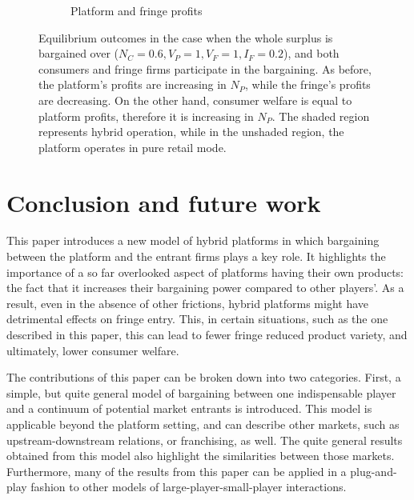 \documentclass[a4paper]{article}
\begin{document}
\begin{figure}
\begin{subfigure}[b]{0.45\textwidth}
        \caption{Platform and fringe profits}
        \label{fig:profits_full_surplus_two_sided}
    \end{subfigure}
    \caption{Equilibrium outcomes in the case when the whole surplus is bargained over ($N_C = 0.6, V_P = 1, V_F = 1, I_F = 0.2$), and both consumers and fringe firms participate in the bargaining. As before, the platform's profits are increasing in $N_P$, while the fringe's profits are decreasing. On the other hand, consumer welfare is equal to platform profits, therefore it is increasing in $N_P$. The shaded region represents hybrid operation, while in the unshaded region, the platform operates in pure retail mode.}
    \label{fig:equilibrium_full_surplus_two_sided}
\end{figure}

\section{Conclusion and future work}
\label{sec:conclusion}

This paper introduces a new model of hybrid platforms in which bargaining between the platform and the entrant firms plays a key role.
It highlights the importance of a so far overlooked aspect of platforms having their own products: the fact that it increases their bargaining power compared to other players'.
As a result, even in the absence of other frictions, hybrid platforms might have detrimental effects on fringe entry.
This, in certain situations, such as the one described in this paper, this can lead to fewer fringe reduced product variety, and ultimately, lower consumer welfare.

The contributions of this paper can be broken down into two categories.
First, a simple, but quite general model of bargaining between one indispensable player and a continuum of potential market entrants is introduced.
This model is applicable beyond the platform setting, and can describe other markets, such as upstream-downstream relations, or franchising, as well.
The quite general results obtained from this model also highlight the similarities between those markets.
Furthermore, many of the results from this paper can be applied in a plug-and-play fashion to other models of large-player-small-player interactions.
\end{document}
